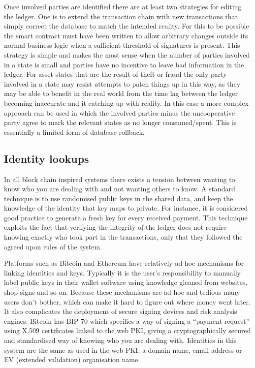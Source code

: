 \documentclass{article}
\begin{document}

Once involved parties are identified there are at least two strategies for editing the ledger. One is to extend
the transaction chain with new transactions that simply correct the database to match the intended reality. For
this to be possible the smart contract must have been written to allow arbitrary changes outside its normal
business logic when a sufficient threshold of signatures is present. This strategy is simple and makes the most
sense when the number of parties involved in a state is small and parties have no incentive to leave bad information
in the ledger. For asset states that are the result of theft or fraud the only party involved in a state may
resist attempts to patch things up in this way, as they may be able to benefit in the real world from the time
lag between the ledger becoming inaccurate and it catching up with reality. In this case a more complex approach
can be used in which the involved parties minus the uncooperative party agree to mark the relevant states as
no longer consumed/spent. This is essentially a limited form of database rollback.

\subsection{Identity lookups}\label{sec:identity-lookups}

In all block chain inspired systems there exists a tension between wanting to know who you are dealing with and
not wanting others to know. A standard technique is to use randomised public keys in the shared data, and keep
the knowledge of the identity that key maps to private. For instance, it is considered good practice to generate
a fresh key for every received payment. This technique exploits the fact that verifying the integrity of the ledger
does not require knowing exactly who took part in the transactions, only that they followed the agreed upon
rules of the system.

Platforms such as Bitcoin and Ethereum have relatively ad-hoc mechanisms for linking identities and keys. Typically
it is the user's responsibility to manually label public keys in their wallet software using knowledge gleaned from
websites, shop signs and so on. Because these mechanisms are ad hoc and tedious many users don't bother, which
can make it hard to figure out where money went later. It also complicates the deployment of secure signing devices
and risk analysis engines. Bitcoin has BIP 70\cite{BIP70} which specifies a way of signing a ``payment
request'' using X.509 certificates linked to the web PKI, giving a cryptographically secured and standardised way
of knowing who you are dealing with. Identities in this system are the same as used in the web PKI: a domain name,
email address or EV (extended validation) organisation name.
\end{document}
